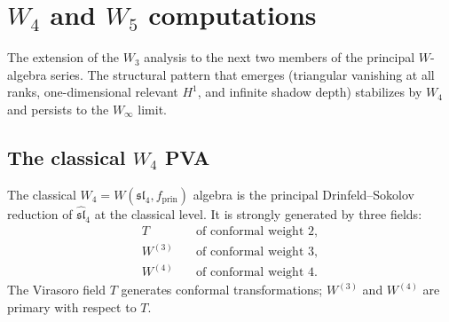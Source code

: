 
\section{$W_4$ and $W_5$ computations}

The extension of the $W_3$ analysis to the next two members of the principal
$W$-algebra series. The structural pattern that emerges (triangular vanishing
at all ranks, one-dimensional relevant $H^1$, and infinite shadow depth) stabilizes
by $W_4$ and persists to the $W_\infty$ limit.

\subsection{The classical $W_4$ PVA}

The classical $W_4 = W(\mathfrak{sl}_4, f_{\mathrm{prin}})$ algebra is the
principal Drinfeld--Sokolov reduction of $\widehat{\mathfrak{sl}}_4$ at the
classical level. It is strongly generated by three fields:
\begin{align}
T &\quad\text{of conformal weight }2,\\
W^{(3)} &\quad\text{of conformal weight }3,\\
W^{(4)} &\quad\text{of conformal weight }4.
\end{align}
The Virasoro field $T$ generates conformal transformations; $W^{(3)}$ and
$W^{(4)}$ are primary with respect to $T$.

